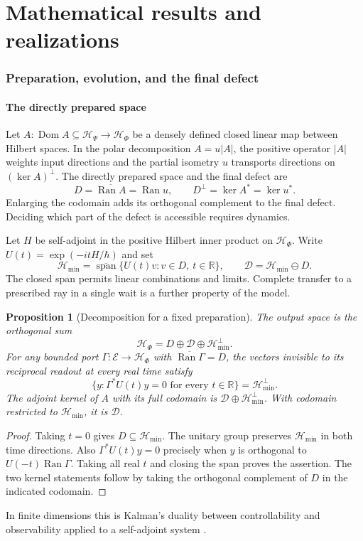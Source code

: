 \documentclass[11pt]{article}
\newtheorem{proposition}{Proposition}[section]
\theoremstyle{definition}
\DeclareMathOperator{\Ran}{Ran}
\DeclareMathOperator{\Span}{span}
\newcommand{\R}{\mathbb R}
\newcommand{\Hmin}{\mathcal H_{\min}}
\begin{document}
\part*{Mathematical results and realizations}

\section{Preparation, evolution, and the final defect}
\label{sec:preparation-evolution}
\subsection{The directly prepared space}
Let $A:\operatorname{Dom}A\subseteq\mathcal H_\Psi\to\mathcal H_\Phi$ be a densely defined closed linear map between Hilbert spaces. In the polar decomposition $A=u|A|$, the positive operator $|A|$ weights input directions and the partial isometry $u$ transports directions on $(\ker A)^\perp$. The directly prepared space and the final defect are
\[
 D=\overline{\Ran A}=\Ran u,\qquad D^\perp=\ker A^*=\ker u^* .
\]
Enlarging the codomain adds its orthogonal complement to the final defect. Deciding which part of the defect is accessible requires dynamics.

Let $H$ be self-adjoint in the positive Hilbert inner product on $\mathcal H_\Phi$. Write $U(t)=\exp(-itH/\hbar)$ and set
\[
 \Hmin=\overline{\Span}\{U(t)v:v\in D,\ t\in\R\},\qquad
 \mathcal D=\Hmin\ominus D .
\]
The closed span permits linear combinations and limits. Complete transfer to a prescribed ray in a single wait is a further property of the model.

\begin{proposition}[Decomposition for a fixed preparation]\label{prop:preparation-split}
The output space is the orthogonal sum
\[
 \mathcal H_\Phi=D\oplus\mathcal D\oplus\Hmin^\perp.
\]
For any bounded port $\Gamma:\mathcal E\to\mathcal H_\Phi$ with $\overline{\Ran\Gamma}=D$, the vectors invisible to its reciprocal readout at every real time satisfy
\[
 \{y:\Gamma^*U(t)y=0\text{ for every }t\in\R\}=\Hmin^\perp.
\]
The adjoint kernel of $A$ with its full codomain is $\mathcal D\oplus\Hmin^\perp$. With codomain restricted to $\Hmin$, it is $\mathcal D$.
\end{proposition}
\begin{proof}
Taking $t=0$ gives $D\subseteq\Hmin$. The unitary group preserves $\Hmin$ in both time directions. Also $\Gamma^*U(t)y=0$ precisely when $y$ is orthogonal to $U(-t)\Ran\Gamma$. Taking all real $t$ and closing the span proves the assertion. The two kernel statements follow by taking the orthogonal complement of $D$ in the indicated codomain.
\end{proof}
In finite dimensions this is Kalman's duality between controllability and observability applied to a self-adjoint system \cite[Sec.~5]{Kalman1963}.
\end{document}

